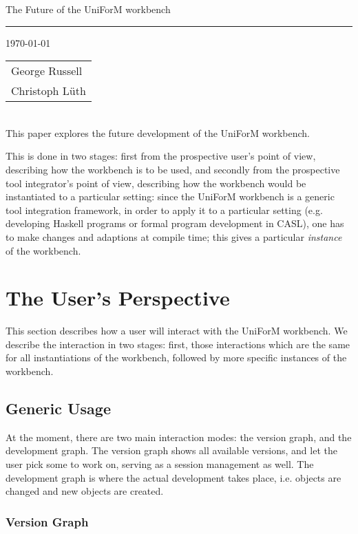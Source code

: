 \documentclass[a4paper]{article}
\begin{document}
{\Large{The Future of the UniForM workbench}}

\rule{\textwidth}{.2pt} 


\today 
\hfill
\begin{tabular}[t]{l}
George Russell \\
Christoph L\"uth
\end{tabular}\\[3ex]

This paper explores the future development of the UniForM workbench.


This is done in two stages: first from the prospective user's point of
view, describing how the workbench is to be used, and secondly from
the prospective tool integrator's point of view, describing how the
workbench would be instantiated to a particular setting: since the
UniForM workbench is a generic tool integration framework, in order to
apply it to a particular setting (e.g. developing Haskell programs or
formal program development in CASL), one has to make changes and
adaptions at compile time; this gives a particular \emph{instance} of
the workbench.


\section{The User's Perspective}

This section describes how a user will interact with the UniForM
workbench. We describe the interaction in two stages: first, those
interactions which are the same for all instantiations of the
workbench, followed by more specific instances of the workbench.


\subsection{Generic Usage}

At the moment, there are two main interaction modes: the version
graph, and the development graph. The version graph shows all
available versions, and let the user pick some to work on, serving as
a session management as well. The development graph is where the
actual development takes place, i.e. objects are changed and new
objects are created. 

\subsubsection{Version Graph}
\end{document}
